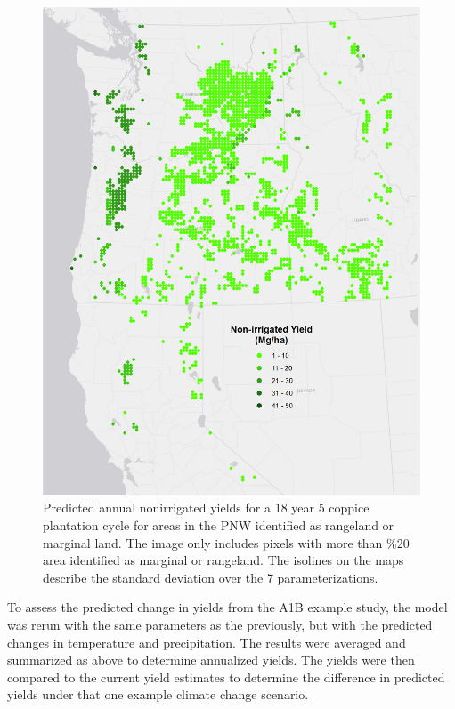 \documentclass[preprint,12pt]{elsarticle}
\begin{document}
\begin{figure}[hp]
  \centering
  \includegraphics[width=1.0\linewidth]{nonirrigated_yield}
  \caption{Predicted annual nonirrigated yields for a 18 year 5 coppice plantation cycle for areas in the \ac{PNW} identified as rangeland or marginal land.  The image only includes pixels with more than \%20 area identified as marginal or rangeland.  The isolines on the maps describe the standard deviation over the 7 parameterizations.}
  \label{fig:nonirrigated_yield}
\end{figure}


To assess the predicted change in yields from the A1B example study,
the model was rerun with the same parameters as the previously, but
with the predicted changes in temperature and precipitation.  The
results were averaged and summarized as above to determine annualized
yields.  The yields were then compared to the current yield estimates
to determine the difference in predicted yields under that one example
climate change scenario.  
\end{document}
